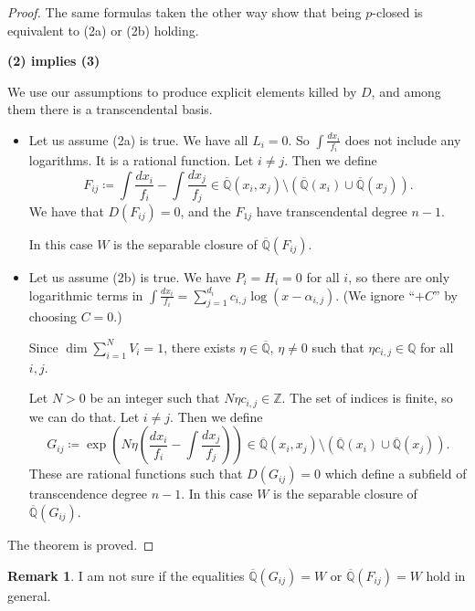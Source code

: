 \documentclass{amsart}
\newcommand{\op}{\operatorname}
\theoremstyle{definition}
\newtheorem{remark}[thm]{Remark}
\begin{document}
\begin{proof}
    The same formulas taken the other way show that being $p$-closed is equivalent to (2a) or (2b) holding.

    \textbf{(2) implies (3)}
    
    We use our assumptions to produce explicit elements killed by $D$, and among them there is a transcendental basis.

    \begin{itemize}
        \item Let us assume (2a) is true. We have all $L_i=0$. So $\int \frac{dx_i}{f_i}$ does not include any logarithms. It is a rational function.
        Let $i\ne j$. Then we define
        \[
        F_{ij}\coloneqq \int \frac{dx_i}{f_i}-\int \frac{dx_j}{f_j} \in \overline{\mathbb{Q}}(x_i,x_j)\setminus \left(\overline{\mathbb{Q}}(x_i)\cup \overline{\mathbb{Q}}(x_j)\right).
        \]
        We have that $D(F_{ij})=0$, and the $ F_{1j} $ have transcendental degree $n-1$.

        In this case $W$ is the separable closure of $\overline{\mathbb{Q}}(F_{ij})$.
        \item Let us assume (2b) is true. We have $ P_i=H_i=0$ for all $ i$, so there are only logarithmic terms in $\int \frac{dx_i}{f_i}=\sum_{j=1}^{d_i} c_{i,j}\op{log}(x-\alpha_{i,j})$. (We ignore ``$+ C$'' by choosing $C=0$.)

        Since $\op{dim}\sum_{i=1}^N V_i=1$, there exists $\eta \in \overline{\mathbb{Q}}$, $\eta \ne 0$ such that $\eta c_{i,j}\in {\mathbb{Q}}$ for all $i,j$.

        Let $N>0$ be an integer such that $N\eta c_{i,j}\in \mathbb{Z}$. The set of indices is finite, so we can do that.
        Let $i\ne j$. Then we define
        \[
        G_{ij} \coloneqq \op{exp}\left(N\eta \left(\frac{dx_i}{f_i}-\int \frac{dx_j}{f_j}\right)\right)\in \overline{\mathbb{Q}}(x_i,x_j)\setminus \left(\overline{\mathbb{Q}}(x_i)\cup \overline{\mathbb{Q}}(x_j)\right).
        \]
        These are rational functions such that $D(G_{ij})=0$ which define a subfield of transcendence degree $n-1$. In this case $W$ is the separable closure of $\overline{\mathbb{Q}}(G_{ij})$.
    \end{itemize}

    The theorem is proved.
\end{proof}

\begin{remark}
    I am not sure if the equalities $\overline{\mathbb{Q}}(G_{ij})=W$ or $\overline{\mathbb{Q}}(F_{ij})=W$ hold in general. 
\end{remark}
\end{document}
